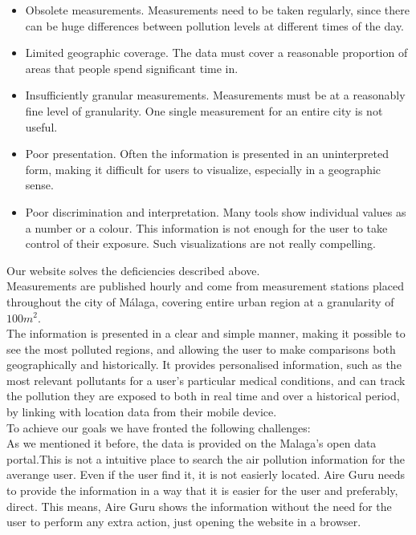 \begin{itemize}

    \item Obsolete measurements. Measurements need to be taken regularly, since there can be huge differences
          between pollution levels at different times of the day.

    \item Limited geographic coverage. The data must cover a reasonable proportion of areas that people spend significant time in.

    \item Insufficiently granular measurements. Measurements must be at a reasonably fine level of granularity. One single measurement for an entire city is not useful.

    \item Poor presentation. Often the information is presented in an uninterpreted form, making it difficult for users to visualize, especially in a geographic sense.

    \item Poor discrimination and interpretation. Many tools show individual values as a number or a colour. This information is not
          enough for the user to take control of their exposure. Such visualizations are not really compelling. 

\end{itemize}

Our website solves the deficiencies described above.\\

Measurements are published hourly and come from measurement stations placed throughout the 
city of Málaga, covering entire urban region at a granularity of $100m^2$.\\

The information is presented in a clear and simple manner, making it possible to see the most polluted regions,
and allowing the user to make comparisons both geographically and historically. It provides personalised information, such as the most relevant 
pollutants for a user's particular medical conditions, and can track
the pollution they are exposed to both in real time and over a historical period, by linking with location data from their mobile device. \\

To achieve our goals we have fronted the following challenges:\\

As we mentioned it before, the data is provided on the Malaga's open data portal.This is not a intuitive place to search the
air pollution information for the averange user. Even if the user find it, it is not 
easierly located. Aire Guru needs to provide the information in a way that it is easier for the user and preferably, direct.
This means, Aire Guru shows the information without the need for the user to perform any extra action, just opening the
website in a browser.\\

